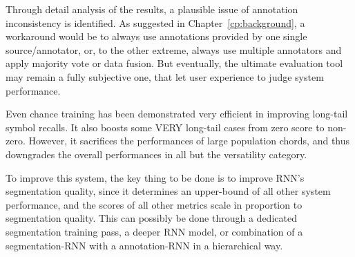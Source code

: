 Through detail analysis of the results, a plausible issue of annotation inconsistency is identified. As suggested in Chapter~\ref{cp:background}, a workaround would be to always use annotations provided by one single source/annotator, or, to the other extreme, always use multiple annotators and apply majority vote or data fusion. But eventually, the ultimate evaluation tool may remain a fully subjective one, that let user experience to judge system performance.

Even chance training has been demonstrated very efficient in improving long-tail symbol recalls. It also boosts some VERY long-tail cases from zero score to non-zero. However, it sacrifices the performances of large population chords, and thus downgrades the overall performances in all but the versatility category.

To improve this system, the key thing to be done is to improve RNN's segmentation quality, since it determines an upper-bound of all other system performance, and the scores of all other metrics scale in proportion to segmentation quality. This can possibly be done through a dedicated segmentation training pass, a deeper RNN model, or combination of a segmentation-RNN with a annotation-RNN in a hierarchical way.





